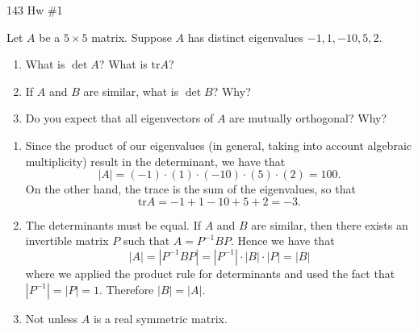 \documentclass[12pt,letterpaper,boxed]{math_hw_pset}
\newcommand{\<}{\left<}
\renewcommand{\>}{\right>}
\begin{document}
\begin{center}
    143 Hw \#1
\end{center}

\begin{exercise}[A5.]
    Let $A$ be a $5\times5$ matrix. Suppose $A$ has distinct eigenvalues 
    $-1, 1, -10, 5,2$.
    \begin{enumerate}
        \item What is $\det A$? What is $\text{tr}A$? 
        \item If $A$ and $B$ are similar, what is $\det B$? Why?
        \item Do you expect that all eigenvectors of $A$ are mutually orthogonal? Why?
    \end{enumerate}
\end{exercise}

\begin{solution}
    \begin{enumerate}
        \item Since the product of our eigenvalues (in general, taking into account algebraic multiplicity)
        result in the determinant,  we have that 
        \[
            |A| =  (-1)\cdot(1)\cdot(-10)\cdot(5)\cdot(2) = 100.
        \]
        On the other hand, the trace is the sum of the eigenvalues, so  that 
        \[
            \text{tr}A  = -1 + 1 -10 + 5 + 2= -3.
        \] 

        \item The determinants must be equal. If $A$ and $B$ are similar, then there exists an invertible matrix $P$ 
        such that $A = P^{-1}BP$. Hence we have that 
        \[
            |A| = |P^{-1}BP| = |P^{-1}|\cdot|B|\cdot|P| = |B|
        \]
        where we applied the product rule for determinants and used the fact that 
        $|P^{-1}|  = |P| = 1$. Therefore $|B| = |A|$. 

        \item Not unless $A$ is a real symmetric matrix. 
    \end{enumerate}
\end{solution}
\end{document}
